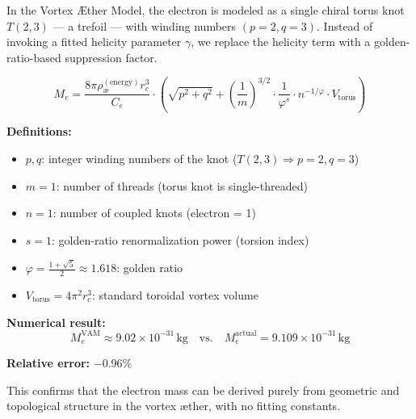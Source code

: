 \documentclass[12pt]{article}
\begin{document}
In the Vortex Æther Model, the electron is modeled as a single chiral torus knot \( T(2,3) \) — a trefoil — with winding numbers \( (p = 2, q = 3) \). Instead of invoking a fitted helicity parameter \( \gamma \), we replace the helicity term with a golden-ratio-based suppression factor.

\[
\boxed{
M_e = \frac{8\pi \rho_\text{\ae}^{(\text{energy})} r_c^3}{C_e} \cdot \left( \sqrt{p^2 + q^2} + \left( \frac{1}{m} \right)^{3/2} \cdot \frac{1}{\varphi^s} \cdot n^{-1/\varphi} \cdot V_{\text{torus}} \right)
}
\]

\textbf{Definitions:}
\begin{itemize}
  \item \( p, q \): integer winding numbers of the knot (\( T(2,3) \Rightarrow p = 2, q = 3 \))
  \item \( m = 1 \): number of threads (torus knot is single-threaded)
  \item \( n = 1 \): number of coupled knots (electron = 1)
  \item \( s = 1 \): golden-ratio renormalization power (torsion index)
  \item \( \varphi = \frac{1+\sqrt{5}}{2} \approx 1.618 \): golden ratio
  \item \( V_{\text{torus}} = 4\pi^2 r_c^3 \): standard toroidal vortex volume
\end{itemize}

\textbf{Numerical result:}
\[
M_e^{\text{VAM}} \approx 9.02 \times 10^{-31} \, \text{kg}
\quad \text{vs.} \quad
M_e^{\text{actual}} = 9.109 \times 10^{-31} \, \text{kg}
\]

\textbf{Relative error:} \( -0.96\% \)

This confirms that the electron mass can be derived purely from geometric and topological structure in the vortex æther, with no fitting constants.



\ifdefined\standalonechapter\else
    
    
    
\end{document}
